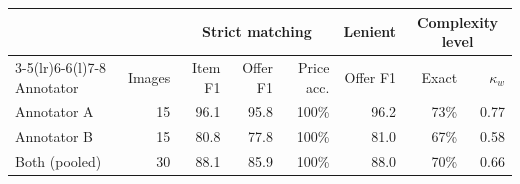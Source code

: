 \begin{tabular}{@{}lrrrrrrr@{}}
\toprule
 & & \multicolumn{3}{c}{Strict matching} & Lenient & \multicolumn{2}{c}{Complexity level} \\
\cmidrule(lr){3-5}\cmidrule(lr){6-6}\cmidrule(l){7-8}
Annotator & Images & Item F1 & Offer F1 & Price acc. & Offer F1 & Exact & $\kappa_w$ \\
\midrule
Annotator A & 15 & 96.1 & 95.8 & 100\% & 96.2 & 73\% & 0.77 \\
Annotator B & 15 & 80.8 & 77.8 & 100\% & 81.0 & 67\% & 0.58 \\
\midrule
Both (pooled) & 30 & 88.1 & 85.9 & 100\% & 88.0 & 70\% & 0.66 \\
\bottomrule
\end{tabular}

